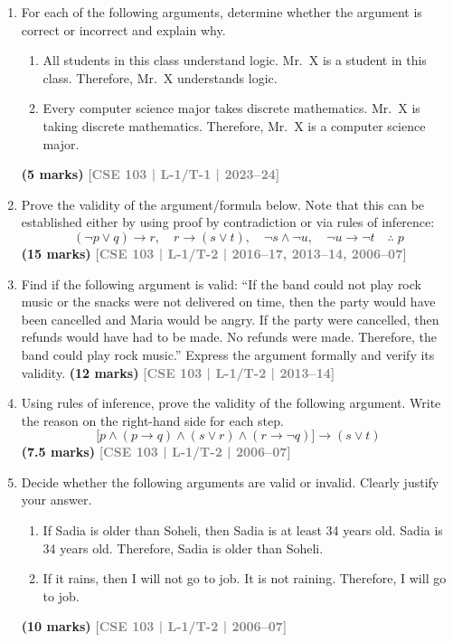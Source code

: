 \documentclass[12pt,a3paper]{article}
\newcommand{\yr}[1]{\hfill\textcolor{gray}{\small\textbf{[#1]}}}
\newcommand{\mk}[1]{\textcolor{orange!70!black}{\small\textbf{(#1 marks)}}}
\begin{document}
\begin{enumerate}

\item For each of the following arguments, determine whether the argument is correct or incorrect and explain why.
\begin{enumerate}
  \item All students in this class understand logic. Mr.\ X is a student in this class. Therefore, Mr.\ X understands logic.
  \item Every computer science major takes discrete mathematics. Mr.\ X is taking discrete mathematics. Therefore, Mr.\ X is a computer science major.
\end{enumerate}
\mk{5} \yr{CSE 103 | L-1/T-1 | 2023--24}

\item Prove the validity of the argument/formula below. Note that this can be established either by using proof by contradiction or via rules of inference:
\[
  (\lnot p \lor q) \to r,\quad r \to (s \lor t),\quad \lnot s \land \lnot u,\quad \lnot u \to \lnot t \quad \therefore\; p
\]
\mk{15} \yr{CSE 103 | L-1/T-2 | 2016--17, 2013--14, 2006--07}

\item Find if the following argument is valid: ``If the band could not play rock music or the snacks were not delivered on time, then the party would have been cancelled and Maria would be angry. If the party were cancelled, then refunds would have had to be made. No refunds were made. Therefore, the band could play rock music.'' Express the argument formally and verify its validity.
\mk{12} \yr{CSE 103 | L-1/T-2 | 2013--14}  

\item Using rules of inference, prove the validity of the following argument. Write the reason on the right-hand side for each step.
\[
  \bigl[p \land (p \to q) \land (s \lor r) \land (r \to \lnot q)\bigr] \to (s \lor t)
\]
\mk{7.5} \yr{CSE 103 | L-1/T-2 | 2006--07}

\item Decide whether the following arguments are valid or invalid. Clearly justify your answer.
\begin{enumerate}
  \item If Sadia is older than Soheli, then Sadia is at least 34 years old. Sadia is 34 years old. Therefore, Sadia is older than Soheli.
  \item If it rains, then I will not go to job. It is not raining. Therefore, I will go to job.
\end{enumerate}
\mk{10} \yr{CSE 103 | L-1/T-2 | 2006--07}

\end{enumerate}
\end{document}
